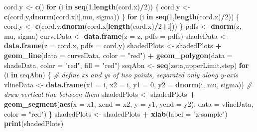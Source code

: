 \documentclass[
]{book}
\newenvironment{Shaded}{\begin{snugshade}}{\end{snugshade}}
\newcommand{\CommentTok}[1]{\textcolor[rgb]{0.56,0.35,0.01}{\textit{#1}}}
\newcommand{\ControlFlowTok}[1]{\textcolor[rgb]{0.13,0.29,0.53}{\textbf{#1}}}
\newcommand{\DataTypeTok}[1]{\textcolor[rgb]{0.13,0.29,0.53}{#1}}
\newcommand{\DecValTok}[1]{\textcolor[rgb]{0.00,0.00,0.81}{#1}}
\newcommand{\KeywordTok}[1]{\textcolor[rgb]{0.13,0.29,0.53}{\textbf{#1}}}
\newcommand{\NormalTok}[1]{#1}
\newcommand{\OperatorTok}[1]{\textcolor[rgb]{0.81,0.36,0.00}{\textbf{#1}}}
\newcommand{\StringTok}[1]{\textcolor[rgb]{0.31,0.60,0.02}{#1}}
\begin{document}
\begin{Shaded}
\begin{Highlighting}[]
\NormalTok{cord.y \textless{}{-}}\StringTok{ }\KeywordTok{c}\NormalTok{()}
\ControlFlowTok{for}\NormalTok{ (i }\ControlFlowTok{in} \KeywordTok{seq}\NormalTok{(}\DecValTok{1}\NormalTok{,}\KeywordTok{length}\NormalTok{(cord.x)}\OperatorTok{/}\DecValTok{2}\NormalTok{)) \{}
\NormalTok{  cord.y \textless{}{-}}\StringTok{ }\KeywordTok{c}\NormalTok{(cord.y,}\KeywordTok{dnorm}\NormalTok{(cord.x[i],mu, sigma))}
\NormalTok{\}}
\ControlFlowTok{for}\NormalTok{ (i }\ControlFlowTok{in} \KeywordTok{seq}\NormalTok{(}\DecValTok{1}\NormalTok{,}\KeywordTok{length}\NormalTok{(cord.x)}\OperatorTok{/}\DecValTok{2}\NormalTok{)) \{}
\NormalTok{  cord.y \textless{}{-}}\StringTok{ }\KeywordTok{c}\NormalTok{(cord.y,}\KeywordTok{dnorm}\NormalTok{(cord.x[}\KeywordTok{length}\NormalTok{(cord.x)}\OperatorTok{/}\DecValTok{2}\OperatorTok{+}\NormalTok{i]))}
\NormalTok{\}}
\NormalTok{pdfs \textless{}{-}}\StringTok{ }\KeywordTok{dnorm}\NormalTok{(z, mu, sigma)}
\NormalTok{curveData \textless{}{-}}\StringTok{ }\KeywordTok{data.frame}\NormalTok{(}\DataTypeTok{z =}\NormalTok{ z, }\DataTypeTok{pdfs =}\NormalTok{ pdfs)}
\NormalTok{shadeData \textless{}{-}}\StringTok{ }\KeywordTok{data.frame}\NormalTok{(}\DataTypeTok{z =}\NormalTok{ cord.x, }\DataTypeTok{pdfs =}\NormalTok{ cord.y)}
\NormalTok{shadedPlots \textless{}{-}}\StringTok{ }\NormalTok{shadedPlots }\OperatorTok{+}\StringTok{ }\KeywordTok{geom\_line}\NormalTok{(}\DataTypeTok{data =}\NormalTok{ curveData, }\DataTypeTok{color =} \StringTok{"red"}\NormalTok{) }\OperatorTok{+}\StringTok{ }\KeywordTok{geom\_polygon}\NormalTok{(}\DataTypeTok{data =}\NormalTok{ shadeData, }\DataTypeTok{color =} \StringTok{"red"}\NormalTok{, }\DataTypeTok{fill =} \StringTok{"red"}\NormalTok{)}
\NormalTok{seqAbn \textless{}{-}}\StringTok{ }\KeywordTok{seq}\NormalTok{(zeta,upperLimit,step)}
\ControlFlowTok{for}\NormalTok{ (i }\ControlFlowTok{in}\NormalTok{ seqAbn) \{}
  \CommentTok{\# define xs and ys of two points, separated only along y{-}axis}
\NormalTok{  vlineData \textless{}{-}}\StringTok{ }\KeywordTok{data.frame}\NormalTok{(}\DataTypeTok{x1 =}\NormalTok{ i, }\DataTypeTok{x2 =}\NormalTok{ i, }\DataTypeTok{y1 =} \DecValTok{0}\NormalTok{, }\DataTypeTok{y2 =} \KeywordTok{dnorm}\NormalTok{(i, mu, sigma))}
  \CommentTok{\# draw vertical line between them}
\NormalTok{  shadedPlots \textless{}{-}}\StringTok{ }\NormalTok{shadedPlots }\OperatorTok{+}\StringTok{ }\KeywordTok{geom\_segment}\NormalTok{(}\KeywordTok{aes}\NormalTok{(}\DataTypeTok{x =}\NormalTok{ x1, }\DataTypeTok{xend =}\NormalTok{ x2, }\DataTypeTok{y =}\NormalTok{ y1, }\DataTypeTok{yend =}\NormalTok{ y2), }\DataTypeTok{data =}\NormalTok{ vlineData, }\DataTypeTok{color =} \StringTok{"red"}\NormalTok{)}
\NormalTok{\}}
\NormalTok{shadedPlots \textless{}{-}}\StringTok{ }\NormalTok{shadedPlots }\OperatorTok{+}\StringTok{ }\KeywordTok{xlab}\NormalTok{(}\DataTypeTok{label =} \StringTok{"z{-}sample"}\NormalTok{)}
\KeywordTok{print}\NormalTok{(shadedPlots)}
\end{Highlighting}
\end{Shaded}
\end{document}
